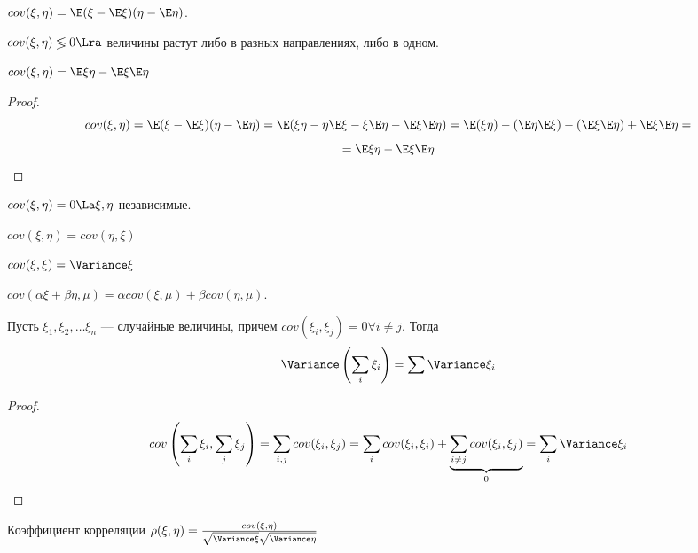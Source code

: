 \begin{definition}
    \(cov(\xi, \eta) = \E(\xi - \E\xi)(\eta - \E\eta)\).
\end{definition}

\begin{note}
    \(cov(\xi, \eta) \lessgtr 0 \Lra\) величины растут либо в разных направлениях, либо в одном.
\end{note}

\begin{proposition}
    \(cov(\xi, \eta) = \E\xi\eta - \E\xi\E\eta\)
\end{proposition}
\begin{proof}
    \[cov(\xi, \eta) = \E(\xi - \E\xi)(\eta - \E\eta) = \E(\xi\eta - \eta\E\xi - \xi\E\eta - \E\xi\E\eta) = \E(\xi\eta) - (\E\eta\E\xi) - (\E\xi\E\eta) + \E\xi\E\eta =\]
    \[= \E\xi\eta - \E\xi\E\eta\]
\end{proof}
\begin{proposition}
    \(cov(\xi, \eta) = 0 \La \xi, \eta\) независимые.
\end{proposition}
\begin{note}
    \(cov(\xi, \eta) = cov(\eta, \xi)\)
\end{note}
\begin{note}
    \(cov(\xi, \xi) = \Variance \xi\)
\end{note}
\begin{note}
    \(cov(\alpha\xi + \beta\eta, \mu) = \alpha cov(\xi, \mu) + \beta cov(\eta, \mu)\).
\end{note}

\begin{proposition}
    Пусть \(\xi_1, \xi_2, \dots \xi_n\) --- случайные величины, причем \(cov(\xi_i, \xi_j) = 0 \forall i \ne j\). Тогда 
    \[\Variance\left(\sum_i \xi_i\right) = \sum \Variance \xi_i\]
\end{proposition}
\begin{proof}
    \[cov\left(\sum_i \xi_i, \sum_j \xi_j\right) = \sum_{i, j} cov(\xi_i, \xi_j) = \sum_i cov(\xi_i, \xi_i) + \underbrace{\sum_{i \ne j} cov(\xi_i, \xi_j)}_{0} = \sum_i \Variance \xi_i\]
\end{proof}

\begin{definition}
    Коэффициент корреляции \(\rho(\xi, \eta) = \frac{cov(\xi, \eta)}{\sqrt{\Variance \xi}\sqrt{\Variance \eta}}\)
\end{definition}

